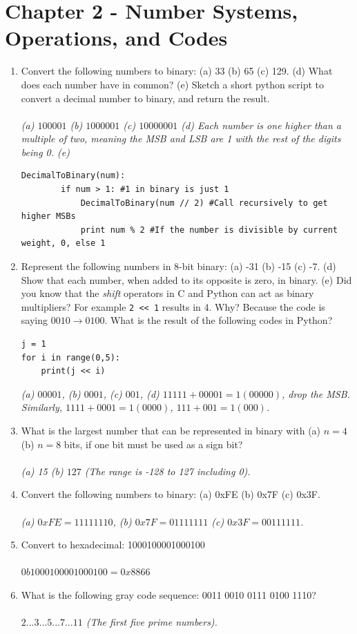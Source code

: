 \documentclass[10pt]{article}
\begin{document}
\section{Chapter 2 - Number Systems, Operations, and Codes}

\begin{enumerate}
\item Convert the following numbers to binary: (a) 33 (b) 65 (c) 129. (d) What does each number have in common? (e) Sketch a short python script to convert a decimal number to binary, and return the result. \\ \\
\textit{(a) $100001$ (b) $1000001$ (c) $10000001$ (d) Each number is one higher than a multiple of two, meaning the MSB and LSB are 1 with the rest of the digits being 0. (e)  }
\begin{verbatim}
DecimalToBinary(num):
        if num > 1: #1 in binary is just 1
            DecimalToBinary(num // 2) #Call recursively to get higher MSBs
            print num % 2 #If the number is divisible by current weight, 0, else 1
\end{verbatim}
\item Represent the following numbers in 8-bit binary: (a) -31 (b) -15 (c) -7.  (d) Show that each number, when added to its opposite is zero, in binary.  (e) Did you know that the \textit{shift} operators in C and Python can act as binary multipliers?  For example \verb+2 << 1+ results in 4.  Why? Because the code is saying $0010 \rightarrow 0100$. What is the result of the following codes in Python? 
\begin{verbatim}
j = 1
for i in range(0,5):
	print(j << i)	
\end{verbatim}
\textit{(a) $00001$, (b) $0001$, (c) $001$, (d) $11111+00001 = 1(00000)$, drop the MSB. Similarly, $1111+0001 = 1(0000)$, $111+001 = 1(000)$.}
\item What is the largest number that can be represented in binary with (a) $n = 4$ (b) $n = 8$ bits, if one bit must be used as a sign bit? \\ \\
\textit{(a) 15 (b) $127$ (The range is -128 to 127 including 0).}
\item Convert the following numbers to binary: (a) 0xFE (b) 0x7F (c) 0x3F. \\ \\
\textit{(a) $0xFE = 1111 1110$, (b) $0x7F = 0111 1111$ (c) $0x3F = 0011 1111$.}
\item Convert to hexadecimal: 1000100001000100 \\ \\
\textit{$0b1000 1000 0100 0100 = 0x8866$}
\item What is the following gray code sequence: 0011 0010 0111 0100 1110? \\ \\
\textit{$2...3...5...7...11$ (The first five prime numbers).}
\end{enumerate}
\end{document}
